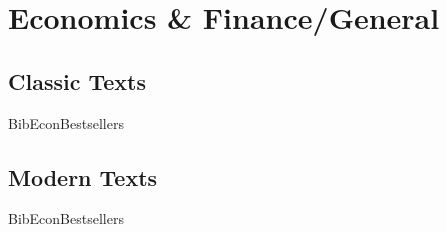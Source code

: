\documentclass[12pt]{article}
\begin{document}
\section*{Economics \& Finance/General}
\subsection*{Classic Texts}
\begin{btUnit}
\begin{btSect}{BibEconBestsellers}
\nocite{Friedman:1962}
\nocite{Friedman:Friedman:1980}
\nocite{Friedman:1992}
\nocite{Galbraith:1954}
\nocite{Galbraith:1994}
\nocite{Galbraith:1958}
\nocite{Hayek:2007}
\nocite{Hayek:1960}
\nocite{Keynes:1936}
\nocite{Kindleberger:1978}
\nocite{Landes:1998}
\nocite{Mises:1949}
\nocite{Rawls:1971}
\nocite{Solow:2000}
\nocite{Smith:1776}
\btPrintCited
\end{btSect}
\end{btUnit}

\subsection*{Modern Texts}
\begin{btUnit}
\begin{btSect}{BibEconBestsellers}
\nocite{Acemoglu:Robinson:2012}
\nocite{Ahamed:2009}
\nocite{Ariely:2008}
\nocite{Akerlof:Shiller:2009}
\nocite{Banerjee:Duflo:2019}
\nocite{Banerjee:Duflo:2012}
\nocite{Bernanke:2015}
\nocite{Blinder:2013}
\nocite{Bowmaker:2006}
\nocite{Buchholz:1996}
\nocite{Buchholz:1989}
\nocite{Caplan:2007}
\nocite{Collier:2009}
\nocite{Collier:2007}
\nocite{Dixit:Nalebuff:1991}
\nocite{Easterly:2008}
\nocite{Easterly:2006}
\nocite{Easterly:2001}
\nocite{Frank:2008}
\nocite{Friedman:2008}
\nocite{Friedman:2005}
\nocite{Friedman:1996}
\nocite{Geithner:2015}
\nocite{Gladwell:2008}
\nocite{Gladwell:2000}
\nocite{Harcourt:2008}
\nocite{Harford:2020}
\nocite{Harford:2005}
\nocite{Hazlitt:1946}
\nocite{Heilbroner:1953}
\nocite{Helpman:2004}
\nocite{Johnson:Kwak:2010}
\nocite{Kay:2004}
\nocite{Kay:2003}
\nocite{Kahneman:2011}
\nocite{Klein:Thompson:2025}
\nocite{Krugman:2008}
\nocite{Krugman:1998}
\nocite{Krugman:1996}
\nocite{Landsburg:1993}
\nocite{Levitt:Dubner:2009}
\nocite{Levitt:Dubner:2005}
\nocite{Lowenstein:2000}
\nocite{McDonald:Robinson:2009}
\nocite{Mian:Sufi:2014}
\nocite{Olson:1982}
\nocite{Piketty:2020:Ideology}
\nocite{Piketty:2014:Capital21c}
\nocite{Reinhart:Rogoff:2009}
\nocite{Ritholtz:2009}
\nocite{Roberts:2008}
\nocite{Rogoff:2025}
\nocite{Rodrik:2007}
\nocite{Roubini:Mihm:2010}
\nocite{Sachs:2008}
\nocite{Sachs:2005}
\nocite{Saez:Zucman:2019}
\nocite{Schelling:1978}
\nocite{Sen:1999}
\nocite{Shiller:2003}
\nocite{Shiller:2000}
\nocite{Smith:2009}
\nocite{Soto:2000}
\nocite{Sorkin:2009}
\nocite{Stiglitz:2006}
\nocite{Stiglitz:2003}
\nocite{Stiglitz:2002}
\nocite{Thaler:2016}
\nocite{Thaler:Sunstein:2008}
\nocite{Wheelan:2002}
\nocite{Zucman:2024}
\btPrintCited
\end{btSect}
\end{btUnit}
\end{document}
